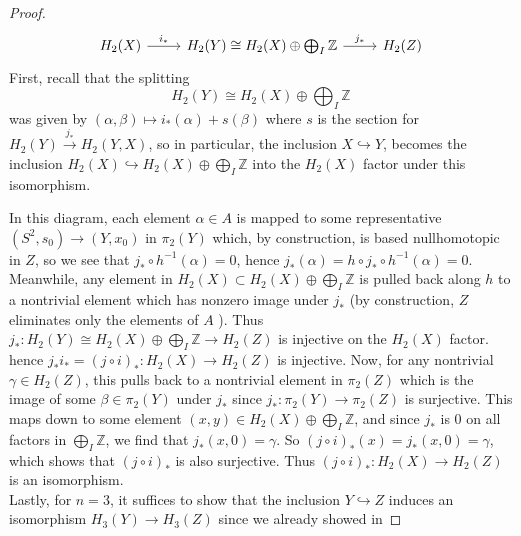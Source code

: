 \begin{proof}
\begin{equation*}
\begin{tikzcd}
        H_2(X) \ar[r, "i_*"] & H_2(Y) 
        \cong H_2(X) \oplus \bigoplus_{I}\mathbb{Z}
        \ar[r, "j_*"] & H_2(Z)
    \end{tikzcd}
    \end{equation*}
    First, recall that the splitting
    \[
    H_2(Y) \cong H_2(X) \oplus \bigoplus_I \mathbb{Z}
    \] 
    was given by
    $\left( \alpha, \beta \right) \mapsto 
    i_* \left( \alpha \right) +
    s \left( \beta \right) $ where
    $s$ is the section for
    $H_2 (Y) \stackrel{j_*}{\to} H_2 (Y,X)$, so
    in particular, the
    inclusion
    $X \hookrightarrow Y$, becomes the inclusion
    $H_2(X) \hookrightarrow H_2(X) \oplus \bigoplus_{I} \mathbb{Z}$ 
    into the $H_2(X)$ factor under this isomorphism.
 
    In this diagram,
    each element $\alpha \in A$ is mapped
    to some representative $\left( S^2, s_0 \right) 
    \to \left( Y, x_0 \right) $ in
    $\pi_2 (Y)$ which, by construction, is based nullhomotopic
    in $Z$, so we see that
    $j_* \circ h^{-1} (\alpha) = 0$, hence
    $j_* \left( \alpha \right) =
    h \circ j_* \circ h^{-1}(\alpha) = 0$.
    Meanwhile, any element in
    $H_2 (X) \subset H_2(X) \oplus \bigoplus_{I}\mathbb{Z}$ 
    is pulled back along $h$ to a nontrivial element
    which has nonzero image under
    $j_*$ (by construction, $Z$ eliminates only
    the elements of $A$ ). Thus
    $j_* \colon
    H_2(Y) \cong H_2(X) \oplus
    \bigoplus_{I}\mathbb{Z} \to H_2(Z)$ is injective
    on the $H_2(X)$ factor.\\
    hence $j_* i_* = \left( j \circ i \right)_* \colon
    H_2 (X) \to H_2 (Z)$ is injective. Now,
    for any nontrivial $\gamma \in H_2 (Z)$,
    this pulls back to a nontrivial element in
    $\pi_2(Z)$ which is the image of some
    $\beta \in \pi_2 (Y)$ under $j_*$ since $j_*\colon
    \pi_2(Y) \to \pi_2(Z)$ is surjective. 
    This maps down to some element
    $\left( x,y \right) \in 
    H_2(X) \oplus \bigoplus_{I}\mathbb{Z}$, and
    since $j_*$ is $0$ on all factors in
    $\bigoplus_{I}\mathbb{Z}$, we find that
    $j_* (x,0) = \gamma$. So
    $\left( j \circ i \right)_* (x) = 
    j_* \left( x,0 \right) = \gamma$, which shows
    that $\left( j \circ i \right)_*$ is also surjective.
    Thus $\left( j \circ i \right)_* \colon
    H_2 (X) \to H_2(Z)$ is an isomorphism.\\
    \linebreak
    Lastly, for $n=3$, it suffices to show that the
    inclusion $Y \hookrightarrow Z$ induces an isomorphism
    $H_3(Y) \to H_3(Z)$ since we already showed in

\end{proof}
